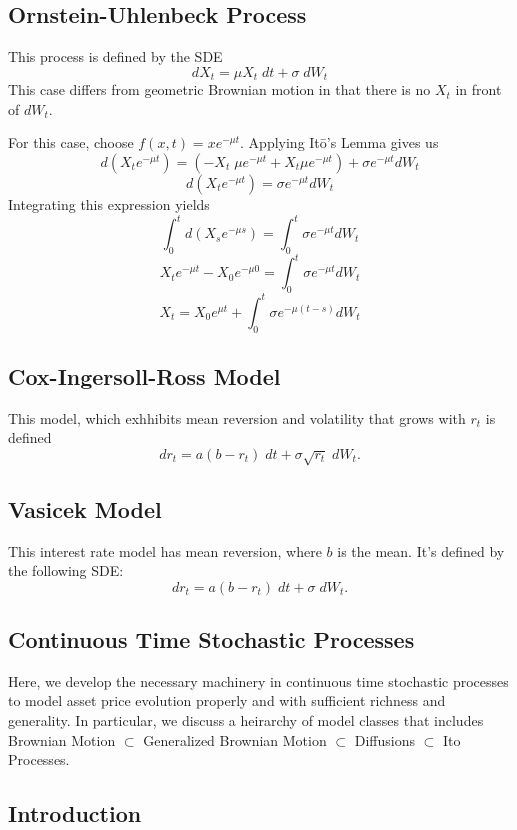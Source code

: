 \documentclass[12pt]{article}
\theoremstyle{plain}
\theoremstyle{definition}
\theoremstyle{remark}
\begin{document}
\subsection{Ornstein-Uhlenbeck Process}

This process is defined by the SDE
   \[ dX_t = \mu X_t \; dt + \sigma \;dW_t \]
This case differs from geometric Brownian motion in that there is no
$X_t$ in front of $dW_t$.

For this case, choose $f(x,t) = xe^{-\mu t}$.  Applying It\={o}'s Lemma
gives us
   \[d(X_t e^{-\mu t})=\left(-X_t\;\mu e^{-\mu t} + X_t \mu e^{-\mu t}
      \right) + \sigma e^{-\mu t} dW_t \]
   \[ d(X_t e^{-\mu t})= \sigma e^{-\mu t} dW_t \]
Integrating this expression yields
   \[ \int^t_0 d(X_s e^{-\mu s}) = \int^t_0 \sigma e^{-\mu t} dW_t \]
   \[ X_t e^{-\mu t} - X_0 e^{-\mu 0} = \int^t_0 \sigma e^{-\mu t} dW_t
      \]
   \[ X_t = X_0 e^{\mu t} + \int^t_0 \sigma e^{-\mu (t-s)} dW_t
      \]

\subsection{Cox-Ingersoll-Ross Model}

This model, which exhhibits mean reversion and volatility that grows
with $r_t$ is defined
   \[ dr_t = a(b-r_t) \; dt + \sigma \sqrt{r_t} \; dW_t.\]

\subsection{Vasicek Model}

This interest rate model has mean reversion, where $b$ is the mean. It's
defined by the following SDE:
   \[ dr_t = a(b-r_t) \; dt + \sigma \; dW_t.\]

\subsection{Continuous Time Stochastic Processes}

Here, we develop the necessary machinery in continuous time stochastic
processes to model asset price evolution properly and with sufficient
richness and generality. In particular, we discuss a heirarchy of model
classes that includes Brownian Motion $\subset$ Generalized Brownian
Motion $\subset$ Diffusions $\subset$ Ito Processes.

\subsection{Introduction}
\end{document}
